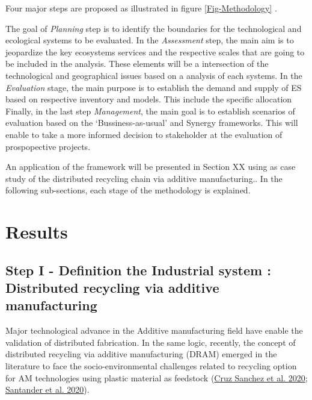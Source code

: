 \documentclass[
]{article}
\begin{document}
Four major steps are proposed as illustrated in figure \ref{Fig-Methodology} .

The goal of \emph{Planning} step is to identify the boundaries for the technological and ecological systems to be evaluated.
In the \emph{Assessment} step, the main aim is to jeopardize the key ecosystems services and the respective scales that are going to be included in the analysis.
These elements will be a intersection of the technological and geographical issues based on a analysis of each systems.
In the \emph{Evaluation} stage, the main purpose is to establish the demand and supply of ES based on respective inventory and models. This include the specific allocation
Finally, in the last step \emph{Management}, the main goal is to establish scenarios of evaluation based on the `Bussiness-as-usual' and Synergy frameworks.
This will enable to take a more informed decision to stakeholder at the evaluation of prospopective projects.

An application of the framework will be presented in Section XX using as case study of the distributed recycling chain via additive manufacturing..
In the following sub-sections, each stage of the methodology is explained.

\hypertarget{results}{%
\section{Results}\label{results}}

\hypertarget{step-i---definition-the-industrial-system-distributed-recycling-via-additive-manufacturing}{%
\subsection{Step I - Definition the Industrial system : Distributed recycling via additive manufacturing}\label{step-i---definition-the-industrial-system-distributed-recycling-via-additive-manufacturing}}

Major technological advance in the Additive manufacturing field have enable the validation of distributed fabrication.
In the same logic, recently, the concept of distributed recycling via additive manufacturing (DRAM) emerged in the literature to face the socio-environmental challenges related to recycling option for AM technologies using plastic material as feedstock (\protect\hyperlink{ref-CruzSanchez2020}{Cruz Sanchez et al. 2020}; \protect\hyperlink{ref-Santander2020}{Santander et al. 2020}).
\end{document}
